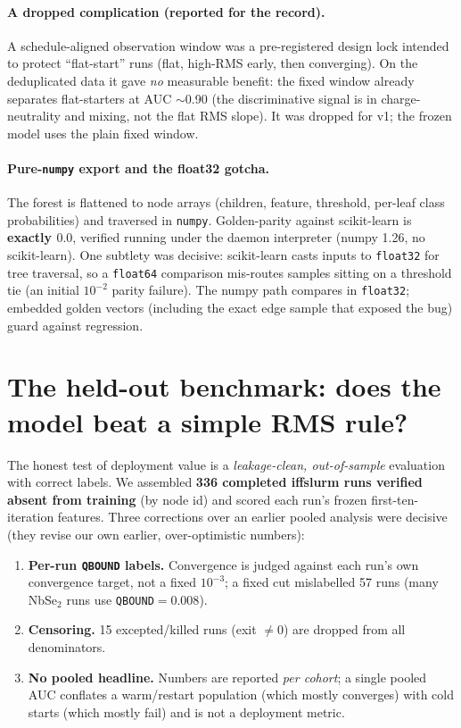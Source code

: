 \documentclass[11pt]{article}
\newcommand{\code}[1]{\texttt{#1}}
\begin{document}
\paragraph{A dropped complication (reported for the record).} A schedule-aligned observation window was
a pre-registered design lock intended to protect ``flat-start'' runs (flat, high-RMS early, then
converging). On the deduplicated data it gave \emph{no} measurable benefit: the fixed window already
separates flat-starters at AUC $\sim$0.90 (the discriminative signal is in charge-neutrality and mixing,
not the flat RMS slope). It was dropped for v1; the frozen model uses the plain fixed window.

\paragraph{Pure-\code{numpy} export and the float32 gotcha.} The forest is flattened to node arrays
(children, feature, threshold, per-leaf class probabilities) and traversed in \code{numpy}. Golden-parity
against scikit-learn is \textbf{exactly $0.0$}, verified running under the daemon interpreter (numpy 1.26,
no scikit-learn). One subtlety was decisive: scikit-learn casts inputs to \code{float32} for tree
traversal, so a \code{float64} comparison mis-routes samples sitting on a threshold tie (an initial
$10^{-2}$ parity failure). The numpy path compares in \code{float32}; embedded golden vectors (including
the exact edge sample that exposed the bug) guard against regression.

\section{The held-out benchmark: does the model beat a simple RMS rule?}
\label{sec:heldout}
The honest test of deployment value is a \emph{leakage-clean, out-of-sample} evaluation with correct
labels. We assembled \textbf{336 completed iffslurm runs verified absent from training} (by node id) and
scored each run's frozen first-ten-iteration features. Three corrections over an earlier pooled analysis
were decisive (they revise our own earlier, over-optimistic numbers):
\begin{enumerate}[leftmargin=1.6em,itemsep=1pt]
  \item \textbf{Per-run \code{QBOUND} labels.} Convergence is judged against each run's own convergence
  target, not a fixed $10^{-3}$; a fixed cut mislabelled 57 runs (many NbSe$_2$ runs use
  \code{QBOUND}$=0.008$).
  \item \textbf{Censoring.} 15 excepted/killed runs (exit $\ne 0$) are dropped from all denominators.
  \item \textbf{No pooled headline.} Numbers are reported \emph{per cohort}; a single pooled AUC conflates
  a warm/restart population (which mostly converges) with cold starts (which mostly fail) and is not a
  deployment metric.
\end{enumerate}
\end{document}
